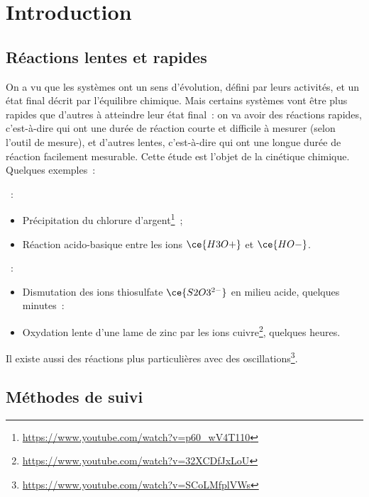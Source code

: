 \documentclass[../../main/main.tex]{subfiles}
\begin{document}
\vfill

\newpage

\vspace*{\fill}
\minitoc
\vspace*{\fill}

\newpage

\section{Introduction}
\subsection{Réactions lentes et rapides}

On a vu que les systèmes ont un sens d'évolution, défini par leurs activités, et
un état final décrit par l'équilibre chimique. Mais certains systèmes vont être
plus rapides que d'autres à atteindre leur état final~: on va avoir des
réactions rapides, c'est-à-dire qui ont une durée de réaction courte et
difficile à mesurer (selon l'outil de mesure), et d'autres lentes, c'est-à-dire
qui ont une longue durée de réaction facilement mesurable. Cette étude est
l'objet de la cinétique chimique. Quelques exemples~:

\begin{itemize}
	~:
	\begin{itemize}
		\item Précipitation du chlorure
		      d'argent\footnote{\label{fn:vid1}\url{https://www.youtube.com/watch?v=p60\_wV4T110}}~;
		\item Réaction acido-basique entre les ions $\ce{H3O+}$ et
		      $\ce{HO-}$.
	\end{itemize}
	~:
	\begin{itemize}
		\item Dismutation des ions thiosulfate $\ce{S2O3^{2-}}$ en
		      milieu acide, quelques minutes~:
		\item Oxydation lente d'une lame de zinc par les ions
		      cuivre\footnote{\url{https://www.youtube.com/watch?v=32XCDfJxLoU}},
		      quelques heures.
	\end{itemize}
\end{itemize}
Il existe aussi des réactions plus particulières avec des
oscillations\footnote{\url{https://www.youtube.com/watch?v=SCoLMfplVWs}}.

\subsection{Méthodes de suivi}
\end{document}
